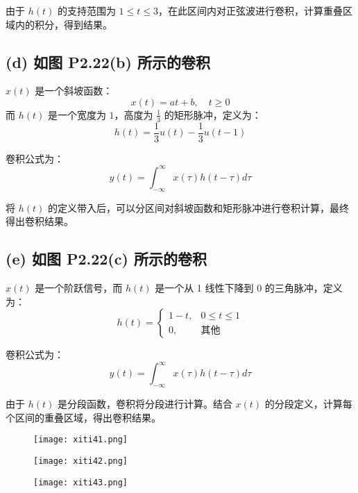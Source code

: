 \documentclass[UTF8]{report}
\theoremstyle{MyLineTheoremStyle} %
\theoremstyle{MyBlockTheoremStyle} %
\theoremstyle{MySubsubsectionStyle} %
\begin{document}
由于 $h(t)$ 的支持范围为 $1 \leq t \leq 3$，在此区间内对正弦波进行卷积，计算重叠区域内的积分，得到结果。

\subsection*{(d) 如图 P2.22(b) 所示的卷积}

$x(t)$ 是一个斜坡函数：
\[
x(t) = at + b, \quad t \geq 0
\]
而 $h(t)$ 是一个宽度为 $1$，高度为 $\frac{1}{3}$ 的矩形脉冲，定义为：
\[
h(t) = \frac{1}{3} u(t) - \frac{1}{3} u(t-1)
\]

卷积公式为：
\[
y(t) = \int_{-\infty}^{\infty} x(\tau) h(t - \tau) d\tau
\]

将 $h(t)$ 的定义带入后，可以分区间对斜坡函数和矩形脉冲进行卷积计算，最终得出卷积结果。

\subsection*{(e) 如图 P2.22(c) 所示的卷积}

$x(t)$ 是一个阶跃信号，而 $h(t)$ 是一个从 1 线性下降到 0 的三角脉冲，定义为：
\[
h(t) =
\begin{cases}
1 - t, & 0 \leq t \leq 1 \\
0, & \text{其他}
\end{cases}
\]

卷积公式为：
\[
y(t) = \int_{-\infty}^{\infty} x(\tau) h(t - \tau) d\tau
\]

由于 $h(t)$ 是分段函数，卷积将分段进行计算。结合 $x(t)$ 的分段定义，计算每个区间的重叠区域，得出卷积结果。

\begin{figure}[ht]
    \centering
    \texttt{[image: xiti41.png]}
\end{figure}

\begin{figure}[ht]
    \centering
    \texttt{[image: xiti42.png]}
\end{figure}

\begin{figure}[ht]
    \centering
    \texttt{[image: xiti43.png]}
\end{figure}
\end{document}
